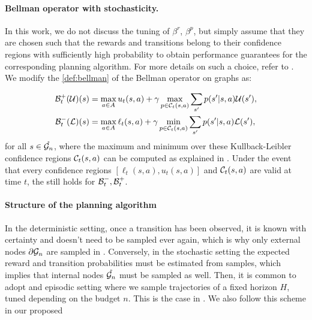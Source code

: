 \documentclass[runningheads]{llncs}
\begin{document}
\paragraph{Bellman operator with stochasticity.}

In this work, we do not discuss the tuning of $\beta^r$, $\beta^p$, but simply assume that they are chosen such that the rewards and transitions belong to their confidence regions with sufficiently high probability to obtain performance guarantees for the corresponding planning algorithm. For more details on such a choice, refer to \citep[e.g.][]{Leurent2019practical, MDPGapE2020}. We modify the \cref{def:bellman} of the Bellman operator on graphs as:

\begin{align*}
\mathcal{B}_t^+(\mathcal{U})(s) &= \max_{a\in A} u_t(s,a) + \gamma \max_{p \in \mathcal{C}_t(s,a)} \sum_{s'} p(s'|s,a) \mathcal{U}(s'), \\
\mathcal{B}_t^-(\mathcal{L})(s) &= \max_{a\in A} \ell_t(s,a) + \gamma \min_{p \in \mathcal{C}_t(s,a)} \sum_{s'} p(s'|s,a)\mathcal{L}(s'),
\end{align*}
for all $s\in\mathring{\mathcal{G}_n}$, where the maximum and minimum over these Kullback-Leibler confidence regions $\mathcal{C}_t(s,a)$ can be computed as explained in \citep[Appendix A of][]{Filippi2010optimism}. Under the event that every confidence regions $[\ell_t(s,a), u_t(s,a)]$ and $\mathcal{C}_t(s,a)$ are valid at time $t$, the  still holds for $\mathcal{B}_t^-, \mathcal{B}_t^+$.

\paragraph{Structure of the planning algorithm}

In the deterministic setting, once a transition has been observed, it is known with certainty and doesn't need to be sampled ever again, which is why only external nodes ${\partial \mathcal{G}_n}$ are sampled in \GBOPD. Conversely, in the stochastic setting the expected reward and transition probabilities must be estimated from samples, which implies that internal nodes $\mathring{\mathcal{G}_n}$ must be sampled as well. Then, it is common to adopt and episodic setting where we sample trajectories of a fixed horizon $H$, tuned depending on the budget $n$. This is the case in  \citep[e.g.][]{Kearns02SS,Kocsis06UCT,Bubeck2010open,Feldman14BRUE,Leurent2019practical,MDPGapE2020}. We also follow this scheme in our proposed \GBOP
\end{document}
